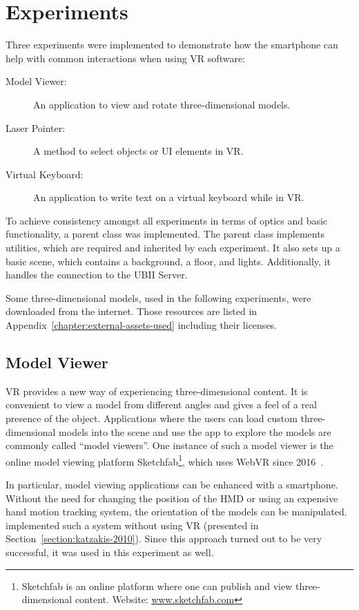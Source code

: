 \chapter{Experiments}\label{chapter:experiments}

Three experiments were implemented to demonstrate how the smartphone can help with common interactions when using \gls{VR} software:

\begin{description}
  \item[Model Viewer:] An application to view and rotate three-dimensional models.
  \item[Laser Pointer:] A method to select objects or \gls{UI} elements in \gls{VR}.
  \item[Virtual Keyboard:] An application to write text on a virtual keyboard while in \gls{VR}.
\end{description}

To achieve consistency amongst all experiments in terms of optics and basic functionality, a parent class was implemented. The parent class implements utilities, which are required and inherited by each experiment. It also sets up a basic scene, which contains a background, a floor, and lights. Additionally, it handles the connection to the \gls{UBII} Server.

Some three-dimensional models, used in the following experiments, were downloaded from the internet. Those resources are listed in Appendix~\ref{chapter:external-assets-used} including their licenses.


\section{Model Viewer}\label{section:model-viewer}

\acrlong{VR} provides a new way of experiencing three-dimensional content. It is convenient to view a model from different angles and gives a feel of a real presence of the object. Applications where the users can load custom three-dimensional models into the scene and use the app to explore the models are commonly called \enquote{model viewers}. One instance of such a model viewer is the online model viewing platform Sketchfab\footnote{Sketchfab is an online platform where one can publish and view three-dimensional content. Website: \href{https://sketchfab.com}{www.sketchfab.com}}, which uses Web\gls{VR} since 2016~\cite{Denoyel.2016}. 

In particular, model viewing applications can be enhanced with a smartphone. Without the need for changing the position of the \gls{HMD} or using an expensive hand motion tracking system, the orientation of the models can be manipulated.
\citeauthor{Katzakis.2010} implemented such a system without using \gls{VR} (presented in Section~\ref{section:katzakis-2010}). Since this approach turned out to be very successful, it was used in this experiment as well.

